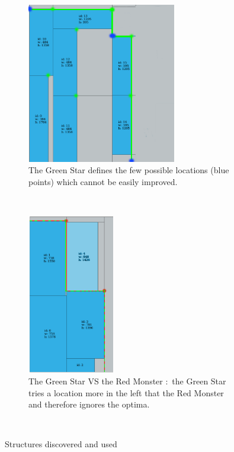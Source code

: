 \documentclass{article}
\begin{document}
    \begin{figure}
        \centering
        \begin{subfigure}[b]{0.48\textwidth}
            \includegraphics[height=7cm]{greenStart.png}
            \caption{The Green Star defines the few possible locations (blue points) which cannot be easily improved.}
            \label{fig:gull}
        \end{subfigure}
        ~ %
        \begin{subfigure}[b]{0.48\textwidth}
            \centering
            \includegraphics[height=7cm]{greenvsred.png}
            \caption{The Green Star VS the Red Monster : the Green Star tries a location more in the left that the Red Monster and therefore ignores the optima.}
            \label{fig:tiger}
        \end{subfigure}
        ~ %
        \caption{Structures discovered and used}\label{fig:animals}
    \end{figure}
\end{document}
